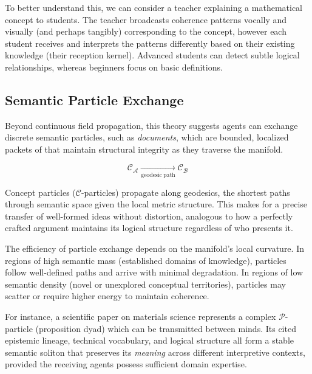 To better understand this, we can consider a teacher explaining a mathematical concept to students. The teacher broadcasts coherence patterns vocally and visually (and perhaps tangibly) corresponding to the concept, however each student receives and interprets the patterns differently based on their existing knowledge (their reception kernel). Advanced students can detect subtle logical relationships, whereas beginners focus on basic definitions.


\subsection{Semantic Particle Exchange}
\label{14.3.2:semantic_particle_exchange}

Beyond continuous field propagation, this theory suggests agents can exchange discrete semantic particles, such as \textit{documents}, which are bounded, localized packets of \meaning that maintain structural integrity as they traverse the manifold.

\begin{equation}
\mathcal{C}_{\mathcal{A}} \xrightarrow[\mathrm{geodesic\ path}]{} \mathcal{C}_{\mathcal{B}}
\end{equation}

Concept particles (\(\mathcal{C}\)-particles) propagate along geodesics, the shortest paths through semantic space given the local metric structure. This makes for a precise transfer of well-formed ideas without distortion, analogous to how a perfectly crafted argument maintains its logical structure regardless of who presents it.

The efficiency of particle exchange depends on the manifold's local curvature. In regions of high semantic mass (established domains of knowledge), particles follow well-defined paths and arrive with minimal degradation. In regions of low semantic density (novel or unexplored conceptual territories), particles may scatter or require higher energy to maintain coherence.

For instance, a scientific paper on materials science represents a complex \(\mathcal{P}\)-particle (proposition dyad) which can be transmitted between minds. Its cited epistemic lineage, technical vocabulary, and logical structure all form a stable semantic soliton that preserves its \textit{meaning} across different interpretive contexts, provided the receiving agents possess sufficient domain expertise.

